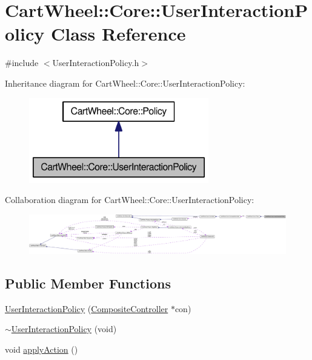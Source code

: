 \hypertarget{classCartWheel_1_1Core_1_1UserInteractionPolicy}{
\section{CartWheel::Core::UserInteractionPolicy Class Reference}
\label{classCartWheel_1_1Core_1_1UserInteractionPolicy}
}


{\ttfamily \#include $<$UserInteractionPolicy.h$>$}



Inheritance diagram for CartWheel::Core::UserInteractionPolicy:\nopagebreak
\begin{figure}[H]
\begin{center}
\leavevmode
\includegraphics[width=222pt]{classCartWheel_1_1Core_1_1UserInteractionPolicy__inherit__graph}
\end{center}
\end{figure}


Collaboration diagram for CartWheel::Core::UserInteractionPolicy:\nopagebreak
\begin{figure}[H]
\begin{center}
\leavevmode
\includegraphics[width=400pt]{classCartWheel_1_1Core_1_1UserInteractionPolicy__coll__graph}
\end{center}
\end{figure}
\subsection*{Public Member Functions}
\begin{DoxyCompactItemize}
\item 
\hyperlink{classCartWheel_1_1Core_1_1UserInteractionPolicy_a9f88ed6295a2c14d281f29bf9cbb5c03}{UserInteractionPolicy} (\hyperlink{classCartWheel_1_1Core_1_1CompositeController}{CompositeController} $\ast$con)
\item 
\hyperlink{classCartWheel_1_1Core_1_1UserInteractionPolicy_a22983661797b83597ea790951037524f}{$\sim$UserInteractionPolicy} (void)
\item 
void \hyperlink{classCartWheel_1_1Core_1_1UserInteractionPolicy_a1b896f869b8d484f552fc5da8a40923f}{applyAction} ()
\end{DoxyCompactItemize}


